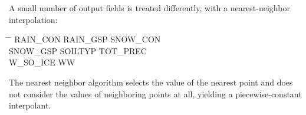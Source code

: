 A small number of output fields is treated differently, with a nearest-neighbor interpolation:
\begin{tabbing}
  \hspace{0.2\textwidth} \= \hspace{0.2\textwidth} \= \hspace{0.2\textwidth} \kill
  RAIN\_CON  \>
  RAIN\_GSP  \>   
  SNOW\_CON  \\
  SNOW\_GSP  \>
  SOILTYP    \>
  TOT\_PREC  \\
  W\_SO\_ICE \>
  WW
\end{tabbing}
The nearest neighbor algorithm selects the value of the nearest point and does
not consider the values of neighboring points at all, yielding a piecewise-constant interpolant. 





%  
